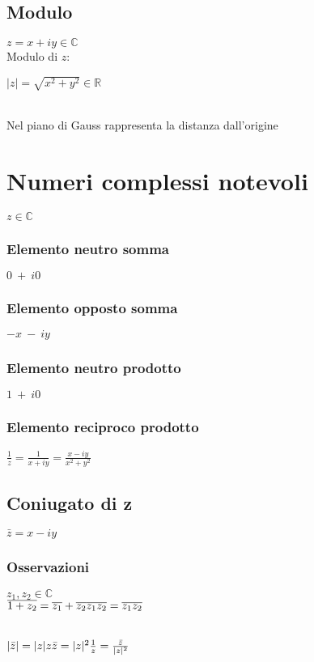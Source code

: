\subsection{Modulo}
$z = x+iy \in \mathbb{C}$\\
Modulo di $z$:\\
\begin{Large}
$|z| = \sqrt{x^2+y^2} \in \mathbb{R}$
\end{Large}\\
Nel piano di Gauss rappresenta la distanza dall'origine

\section{Numeri complessi notevoli}
$z \in \mathbb{C}$
\subsubsection{Elemento neutro somma}
$0\ +\ i0$
\subsubsection{Elemento opposto somma}
$-x\ -\ iy$
\subsubsection{Elemento neutro prodotto}
$1\ +\ i0$
\subsubsection{Elemento reciproco prodotto}
\begin{Large}
$\frac{1}{z}=\frac{1}{x+iy}=\frac{x-iy}{x^2+y^2}$
\end{Large}

\subsection{Coniugato di z}
$\bar{z} = x-iy$
\subsubsection{Osservazioni}
$z_1,z_2 \in \mathbb{C}$\\
$\overline{1+z_2} = \overline{z_1}+\overline{z_2}\\
\overline{z_1z_2} = \overline{z_1}\overline{z_2}$\\
\\
\begin{Large}
$|\bar{z}| = |z|\\
z\bar{z}=|z|^2\\
\frac{1}{z} = \frac{\bar{z}}{|z|^2}$
\end{Large}

